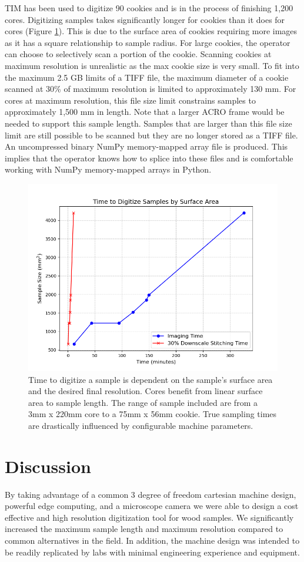 \documentclass[a4paper,12pt]{article}
\begin{document}
TIM has been used to digitize 90 cookies and is in the process of finishing 1,200 cores. 
Digitizing samples takes significantly longer for cookies than it does for cores (Figure \ref{fig:digitization_time}). This is due to the surface area of cookies requiring more images as it has a square relationship to sample radius.
For large cookies, the operator can choose to selectively scan a portion of the cookie. Scanning cookies at maximum resolution is unrealistic as the max cookie size is very small. 
To fit into the maximum 2.5 GB limits of a TIFF file, the maximum diameter of a cookie scanned at 30\% of maximum resolution is limited to approximately 130 mm. For cores at maximum resolution, this file size limit 
constrains samples to approximately 1,500 mm in length. Note that a larger ACRO frame would be needed to support this sample length. Samples that are larger than this file size limit are still possible to be scanned but they are no longer stored as a TIFF file. 
An uncompressed binary NumPy memory-mapped array file is produced. This implies that the operator knows how to splice into these files and is comfortable working with NumPy memory-mapped arrays in Python.

\begin{figure}
    \centering
    \includegraphics[height=0.5\linewidth]{../../code/plots/time_and_area.png}
    \caption{Time to digitize a sample is dependent on the sample's surface area and the desired final resolution.
    Cores benefit from linear surface area to sample length. The range of sample included are from a 3mm x 220mm core to a 75mm x 56mm cookie. True sampling times are drastically influenced by configurable machine parameters.}
    \label{fig:digitization_time}
\end{figure}

\section{Discussion}
By taking advantage of a common 3 degree of freedom cartesian machine design, powerful edge computing, and a microscope camera we were able to design a cost effective and high resolution digitization tool for wood samples. 
We significantly increased the maximum sample length and maximum resolution compared to common alternatives in the field. 
In addition, the machine design was intended to be readily replicated by labs with minimal engineering experience and equipment. 
\end{document}
